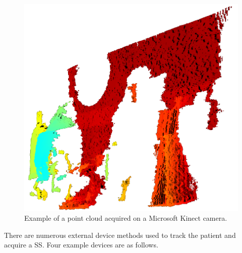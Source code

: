                 \begin{figure}
                    \centering
                    
                    \includegraphics[width=1.0\linewidth]{figures/background_3dpc_example.png}
                    
                    \captionsetup{singlelinecheck=false}
                    \caption{
                        Example of a point cloud acquired on a Microsoft Kinect camera.
                    }
                    \label{fig:external_devices_3dpc_example}
                \end{figure}
                
                There are numerous external device methods used to track the patient and acquire a \gls{SS}.  Four example devices are as follows.
                
